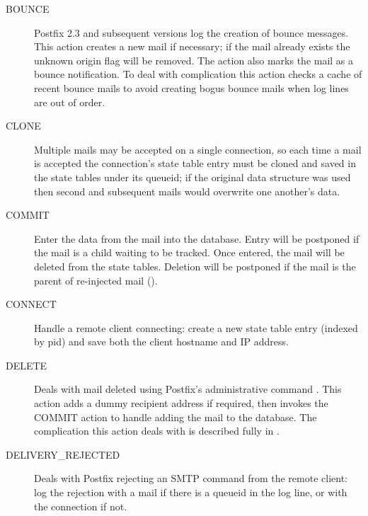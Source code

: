 \begin{description}

    \item [BOUNCE] Postfix 2.3 and subsequent versions log the creation of
        bounce messages.  This action creates a new mail if necessary; if
        the mail already exists the unknown origin flag will be removed.
        The action also marks the mail as a bounce notification.  To deal
        with complication  this action checks a cache of
        recent bounce mails to avoid creating bogus bounce mails when log
        lines are out of order.

    \item [CLONE] Multiple mails may be accepted on a single connection, so
        each time a mail is accepted the connection's state table entry
        must be cloned and saved in the state tables under its queueid; if
        the original data structure was used then second and subsequent
        mails would overwrite one another's data.

    \item [COMMIT] Enter the data from the mail into the database. Entry
        will be postponed if the mail is a child waiting to be tracked.
        Once entered, the mail will be deleted from the state tables.
        Deletion will be postponed if the mail is the parent of re-injected
        mail ().

    \item [CONNECT] Handle a remote client connecting: create a new state
        table entry (indexed by  \gls{pid}) and save both the
        client hostname and \gls{IP} address.

    \item [DELETE] Deals with mail deleted using Postfix's administrative
        command .  This action adds a dummy recipient
        address if required, then invokes the COMMIT action to handle
        adding the mail to the database.  The complication this action
        deals with is described fully in .  

    \item [DELIVERY\_REJECTED] Deals with Postfix rejecting an \gls{SMTP}
        command from the remote client: log the rejection with a mail if
        there is a queueid in the log line, or with the connection if not.


\end{description}

